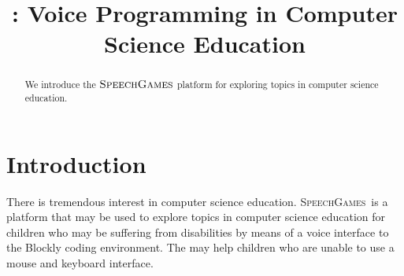 \documentclass[]{article}
\title{\sg: Voice Programming in Computer Science Education}
\def\sg{\textsc{SpeechGames}}
\begin{document}
\maketitle

\begin{abstract}
  We introduce the $\sg$ platform for exploring topics in computer science
  education.
\end{abstract}

\section{Introduction}


There is tremendous interest in computer science education.
\sg~is a platform
that may be used to explore topics in computer science education for children
who may be suffering from disabilities by means of a voice interface to the
Blockly coding environment. The may help children who are unable to use a mouse
and keyboard interface.


\end{document}
